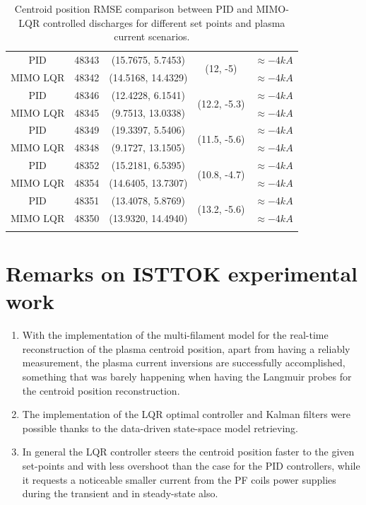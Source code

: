 \begin{center}
\begin{longtable}{||c| c| c| c|c||}
		\hline
		PID & 48343 &(15.7675,	5.7453)   & \multirow{ 2}{*}{(12, -5)}&  $\approx -4 kA$  \\ 
		\cline{1-3} \cline{5-5}
		MIMO LQR & 48342 & (14.5168,	14.4329) & &  $\approx -4 kA$  \\
		\hline
		PID & 48346 & (12.4228,	6.1541)  & \multirow{ 2}{*}{(12.2, -5.3)}& $\approx -4 kA$\\ 
		\cline{1-3} \cline{5-5}
		MIMO LQR & 48345 & (9.7513,	13.0338) & & $\approx -4 kA$ \\
		\hline
		PID & 48349 & (19.3397,	5.5406)  & \multirow{ 2}{*}{(11.5, -5.6)}&$\approx -4 kA$  \\ 
		\cline{1-3} \cline{5-5}
		MIMO LQR & 48348 & (9.1727,	13.1505) & &$\approx -4 kA$  \\
		\hline
		PID & 48352 &  (15.2181,	6.5395) & \multirow{ 2}{*}{(10.8, -4.7)} &$\approx -4 kA$ \\ 
		\cline{1-3} \cline{5-5}
		MIMO LQR & 48354 & (14.6405,	13.7307) & & $\approx -4 kA$ \\
		\hline
		PID & 48351 &  (13.4078, 5.8769) & \multirow{ 2}{*}{(13.2, -5.6)}& $\approx -4 kA$ \\ 
		\cline{1-3} \cline{5-5} 
		MIMO LQR & 48350 & (13.9320,	14.4940) & &$\approx -4 kA$  \\
		\hline 
		\caption{Centroid position RMSE comparison between PID and MIMO-LQR controlled discharges for different set points and plasma current scenarios.}
	\end{longtable}
	\label{TableControl}
	
\end{center}

\section{Remarks on ISTTOK experimental work}
\begin{enumerate}
	\item With the implementation of the multi-filament model for the real-time reconstruction of the plasma centroid position, apart from  having a reliably measurement, the plasma current inversions are successfully accomplished, something that was barely happening when having the Langmuir probes for the centroid position reconstruction.\smallskip
	
	\item The implementation of the LQR optimal controller and Kalman filters were possible thanks to the data-driven state-space model retrieving.\smallskip
	
	\item In general the LQR controller steers the centroid position faster to the given set-points and with less overshoot than the case for the PID controllers, while it requests a noticeable smaller current from the PF coils power supplies during the transient and in steady-state also.
	
\end{enumerate}



